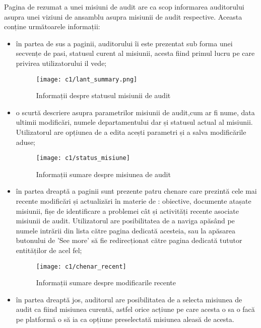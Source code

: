 Pagina de rezumat a unei misiuni de audit are ca scop informarea auditorului asupra unei viziuni de ansamblu asupra misiunii de audit respective. Aceasta conține următoarele informații:\\
\begin{itemize}
	
	\item în partea de sus a paginii, auditorului îi este prezentat sub forma unei secvențe de pasi, statusul curent al misiunii, acesta fiind primul lucru pe care privirea utilizatorului il vede;
		
		\begin{figure}[h]
		\centering
		
		\texttt{[image: c1/lant\_summary.png]}
		\caption{Informații despre statusul misiunii de audit}
	\end{figure}

	\item o scurtă descriere asupra parametrilor misiunii de audit,cum ar fi nume, data ultimii modificări, numele departamentului dar și statusul actual al misiunii. Utilizatorul are opțiunea de a edita acești parametri și a salva modificările aduse;
	
		\vspace{0.5 cm}
	\begin{figure}[h]
		\centering
		
		\texttt{[image: c1/status\_misiune]}
		\caption{Informații sumare despre misiunea de audit}
	\end{figure}
	
	\item în partea dreaptă a paginii sunt prezente patru chenare care prezintă cele mai recente modificări și actualizări în materie de : obiective, documente atașate misiunii, fișe de identificare a problemei cât și activități recente asociate misiunii de audit. Utilizatorul are posibilitatea de a naviga apăsând pe numele intrării din lista către pagina dedicată acesteia, sau la apăsarea butonului de 'See more' să fie redirecționat către pagina dedicată tututor entităților de acel fel;
	
	\begin{figure}[h]
		\centering
		
		\texttt{[image: c1/chenar\_recent]}
		\caption{Informații sumare despre modificarile recente}
	\end{figure}

	\item în partea dreaptă jos, auditorul are posibilitatea de a selecta misiunea de audit ca fiind misiunea curentă, astfel orice acțiune pe care acesta o sa o facă pe platformă o să ia ca opțiune preselectată misiunea aleasă de acesta.\\
		
	
\end{itemize}


